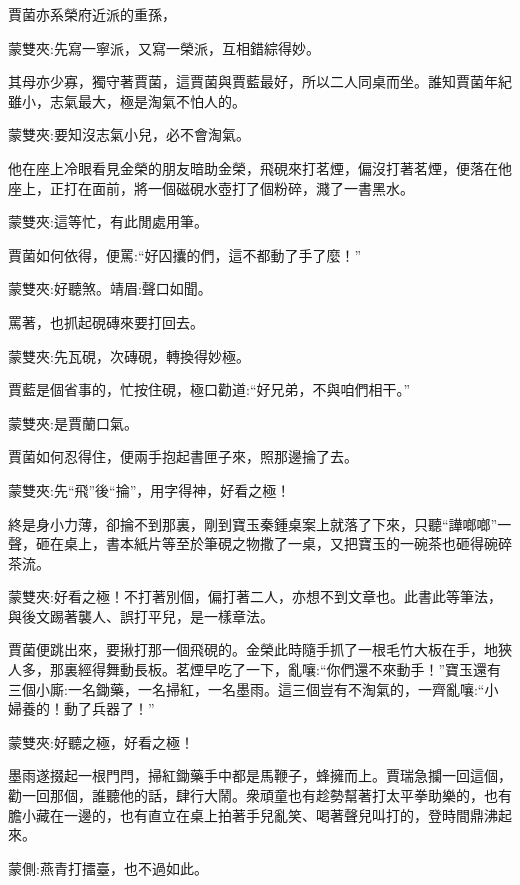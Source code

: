 \begin{parag}
    賈菌亦系榮府近派的重孫，\begin{note}蒙雙夾:先寫一寧派，又寫一榮派，互相錯綜得妙。\end{note}其母亦少寡，獨守著賈菌，這賈菌與賈藍最好，所以二人同桌而坐。誰知賈菌年紀雖小，志氣最大，極是淘氣不怕人的。\begin{note}蒙雙夾:要知沒志氣小兒，必不會淘氣。\end{note}他在座上冷眼看見金榮的朋友暗助金榮，飛硯來打茗煙，偏沒打著茗煙，便落在他座上，正打在面前，將一個磁硯水壺打了個粉碎，濺了一書黑水。\begin{note}蒙雙夾:這等忙，有此閒處用筆。\end{note}賈菌如何依得，便罵:“好囚攮的們，這不都動了手了麼！”\begin{note}蒙雙夾:好聽煞。靖眉:聲口如聞。\end{note}罵著，也抓起硯磚來要打回去。\begin{note}蒙雙夾:先瓦硯，次磚硯，轉換得妙極。\end{note}賈藍是個省事的，忙按住硯，極口勸道:“好兄弟，不與咱們相干。”\begin{note}蒙雙夾:是賈蘭口氣。\end{note}賈菌如何忍得住，便兩手抱起書匣子來，照那邊掄了去。\begin{note}蒙雙夾:先“飛”後“掄”，用字得神，好看之極！\end{note}終是身小力薄，卻掄不到那裏，剛到寶玉秦鍾桌案上就落了下來，只聽“譁啷啷”一聲，砸在桌上，書本紙片等至於筆硯之物撒了一桌，又把寶玉的一碗茶也砸得碗碎茶流。\begin{note}蒙雙夾:好看之極！不打著別個，偏打著二人，亦想不到文章也。此書此等筆法，與後文踢著襲人、誤打平兒，是一樣章法。\end{note}賈菌便跳出來，要揪打那一個飛硯的。金榮此時隨手抓了一根毛竹大板在手，地狹人多，那裏經得舞動長板。茗煙早吃了一下，亂嚷:“你們還不來動手！”寶玉還有三個小廝:一名鋤藥，一名掃紅，一名墨雨。這三個豈有不淘氣的，一齊亂嚷:“小婦養的！動了兵器了！”\begin{note}蒙雙夾:好聽之極，好看之極！\end{note}墨雨遂掇起一根門閂，掃紅鋤藥手中都是馬鞭子，蜂擁而上。賈瑞急攔一回這個，勸一回那個，誰聽他的話，肆行大鬧。衆頑童也有趁勢幫著打太平拳助樂的，也有膽小藏在一邊的，也有直立在桌上拍著手兒亂笑、喝著聲兒叫打的，登時間鼎沸起來。\begin{note}蒙側:燕青打擂臺，也不過如此。\end{note}
\end{parag}


